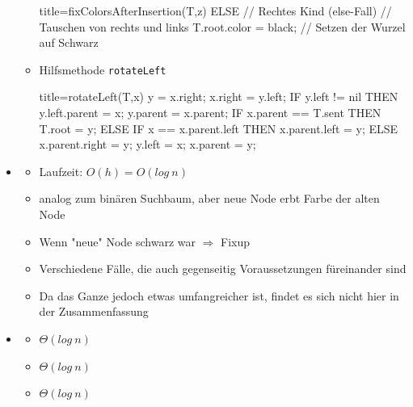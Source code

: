 \documentclass[
    12pt,
    a4paper,
    ngerman,
    color=3b,%
    marginpar=false,
    colorback=false,
    leqno,
]{tudaexercise}
\begin{document}
\begin{itemize}
\begin{itemize}
\begin{ccode}[autogobble,fontsize=\small]{title={fixColorsAfterInsertion(T,z)}}
                                ELSE                                        // Rechtes Kind (else-Fall)
                                    // Tauschen von rechts und links
                                T.root.color = black;                       // Setzen der Wurzel auf Schwarz
                            \end{ccode}
                \item Hilfsmethode \texttt{rotateLeft}
                            \begin{ccode}[autogobble]{title={rotateLeft(T,x)}}
                            y = x.right;
                            x.right = y.left;
                            IF y.left != nil THEN
                                y.left.parent = x;
                            y.parent = x.parent;
                            IF x.parent == T.sent THEN
                                T.root = y;
                            ELSE
                                IF x == x.parent.left THEN
                                    x.parent.left = y;
                                ELSE
                                    x.parent.right = y;
                            y.left = x;
                            x.parent = y;
                            \end{ccode}
            \end{itemize}
\clearpage
        \item {}
            \begin{itemize}
                \item Laufzeit: $O(h) = O(log~n)$
                \item analog zum binären Suchbaum, aber neue Node erbt Farbe der alten Node
                \item Wenn "neue" Node schwarz war $\Rightarrow$ Fixup
                \item Verschiedene Fälle, die auch gegenseitig Voraussetzungen füreinander sind 
                \item Da das Ganze jedoch etwas umfangreicher ist, findet es sich nicht hier in der Zusammenfassung
            \end{itemize}
        
        \item {}
            \begin{itemize}
                \item {} $\Theta(log~n)$
                \item {} $\Theta(log~n)$
                \item {} $\Theta(log~n)$
            \end{itemize}
    \end{itemize}
\end{document}
